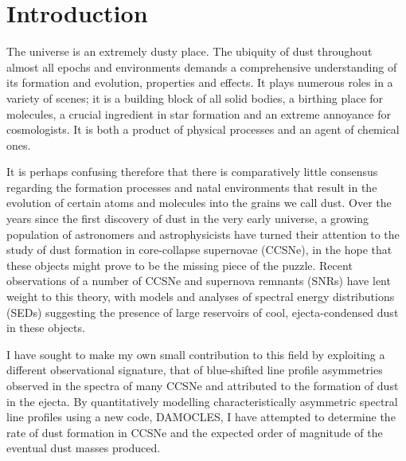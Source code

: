 \chapter{Introduction}\label{chp:chp1}

%
%



The universe is an extremely dusty place.  The ubiquity of dust throughout almost all epochs and environments demands a comprehensive understanding of its formation and evolution, properties and effects.  It plays numerous roles in a variety of scenes; it is a building block of  all solid bodies, a birthing place for molecules, a crucial ingredient in star formation and an extreme annoyance for cosmologists.  It is both a product of physical processes and an agent of chemical ones.

It is perhaps confusing therefore that there is comparatively little consensus regarding the formation processes and natal environments that result in the evolution of certain atoms and molecules into the grains we call dust.  Over the years since the first discovery  of dust in the very early universe, a growing population of astronomers and astrophysicists have turned their attention to the study of dust formation in core-collapse supernovae (CCSNe), in the hope that these objects might prove to be the missing piece of the puzzle.  Recent observations of a number of CCSNe and supernova remnants (SNRs) have lent weight to this theory, with models and analyses of spectral energy distributions (SEDs)  suggesting the presence of large reservoirs of cool, ejecta-condensed dust in these objects. 

I have sought to make my own small contribution to this field by exploiting a different observational signature, that of  blue-shifted line profile asymmetries observed in the spectra of many CCSNe and attributed to the formation of dust in the ejecta.  By quantitatively modelling characteristically asymmetric spectral line profiles using a new code, DAMOCLES, I have attempted to determine the rate of dust formation in CCSNe and the expected order of magnitude of the eventual dust masses produced.

